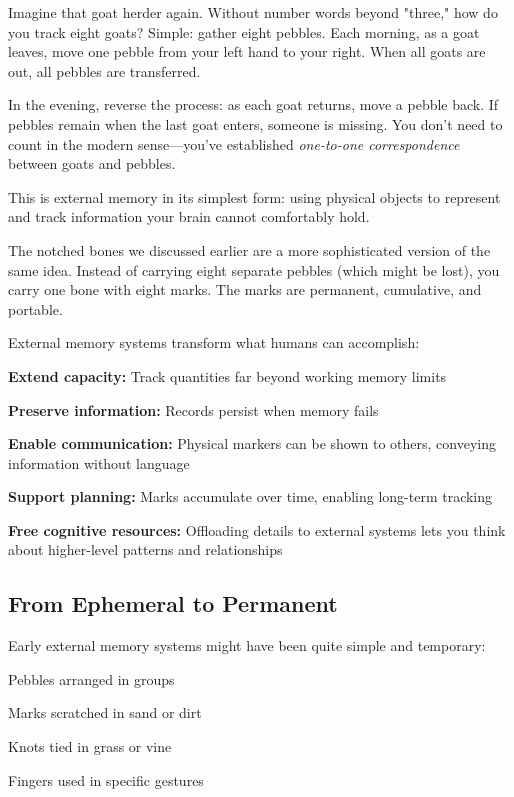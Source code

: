 Imagine that goat herder again. Without number words beyond "three," how do you track eight goats? Simple: gather eight pebbles. Each morning, as a goat leaves, move one pebble from your left hand to your right. When all goats are out, all pebbles are transferred. 

In the evening, reverse the process: as each goat returns, move a pebble back. If pebbles remain when the last goat enters, someone is missing. You don't need to count in the modern sense—you've established \textit{one-to-one correspondence} between goats and pebbles.

This is external memory in its simplest form: using physical objects to represent and track information your brain cannot comfortably hold.

The notched bones we discussed earlier are a more sophisticated version of the same idea. Instead of carrying eight separate pebbles (which might be lost), you carry one bone with eight marks. The marks are permanent, cumulative, and portable.

\begin{keyidea}
	External memory systems transform what humans can accomplish:
	
	\textbf{Extend capacity:} Track quantities far beyond working memory limits
	
	\textbf{Preserve information:} Records persist when memory fails
	
	\textbf{Enable communication:} Physical markers can be shown to others, conveying information without language
	
	\textbf{Support planning:} Marks accumulate over time, enabling long-term tracking
	
	\textbf{Free cognitive resources:} Offloading details to external systems lets you think about higher-level patterns and relationships
\end{keyidea}

\subsection{From Ephemeral to Permanent}

Early external memory systems might have been quite simple and temporary:
\begin{compactitem}
	\item Pebbles arranged in groups
	\item Marks scratched in sand or dirt
	\item Knots tied in grass or vine
	\item Fingers used in specific gestures
\end{compactitem}

